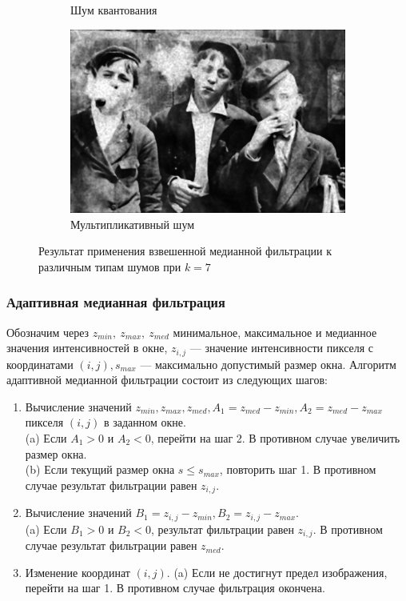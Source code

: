 \begin{figure}[ht!]
\begin{subfigure}[b]{0.5\linewidth}
      \caption{Шум квантования} 
      \label{median2d_7:e}
    \end{subfigure}%
    \begin{subfigure}[b]{0.5\linewidth}
        \centering
        \includegraphics[width=0.95\linewidth]{../Median_2D_Filter/Median_2DSpeckle_noise_(k=7).jpg} 
        \caption{Мультипликативный шум} 
        \label{median2d_7:f} 
    \end{subfigure} 
    \caption{Результат применения взвешенной медианной фильтрации к различным типам шумов при $k = 7$}
    \label{img:median2d_7} 
\end{figure}
\FloatBarrier


\subsubsection{Адаптивная медианная фильтрация}

Обозначим через $z_{min},~z_{max},~z_{med}$ минимальное, максимальное и медианное значения интенсивностей в окне, $z_{i,j}$ — значение интенсивности пикселя с координатами $(i, j), s_{max}$ — максимально допустимый размер окна.
Алгоритм адаптивной медианной фильтрации
состоит из следующих шагов: \\
\begin{enumerate}
    \item Вычисление значений $z_{min}, z_{max}, z_{med}, A_1 =  z_{med} - z_{min}, A_2 = z_{med} - z_{max}$ пикселя $(i, j)$ в заданном окне. \\
    (a) Если $A_1 > 0 $ и $A_2 < 0$, перейти на шаг 2. В противном случае увеличить размер окна. \\
    (b) Если текущий размер окна $s \le s_{max}$, повторить шаг 1. В
противном случае результат фильтрации равен $z_{i,j}$. 
    \item Вычисление значений $B_1 = z_{i,j} - z_{min}, B_2 = z_{i,j} - z_{max}$. \\
    (a) Если $B_1 > 0$ и $B_2 < 0$, результат фильтрации равен $z_{i,j}$.
    В противном случае результат фильтрации равен $z_{med}$.

    \item Изменение координат $(i,j)$.
    (a) Если не достигнут предел изображения, перейти на шаг 1. В противном случае фильтрация окончена.
\end{enumerate}


